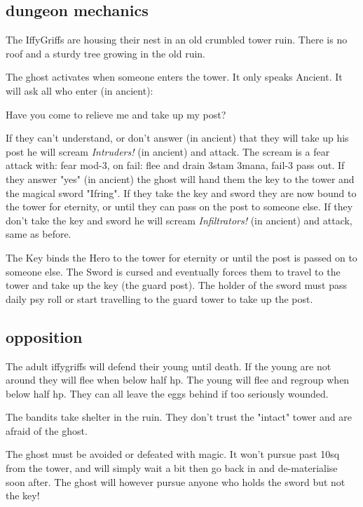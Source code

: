 \subsection*{dungeon mechanics}

The IffyGriffs are housing their nest in an old crumbled tower ruin. There is no roof and a sturdy tree growing in the old ruin.

The ghost activates when someone enters the tower. It only speaks Ancient. It will ask all who enter (in ancient):
\begin{readoutloud}
 Have you come to relieve me and take up my post?
\end{readoutloud}
If they can't understand, or don't answer (in ancient) that they will take up his post he will scream \emph{Intruders!} (in ancient) and attack. The scream is a fear attack with: fear mod-3, on fail: flee and drain 3stam 3mana, fail-3 pass out.
If they answer "yes" (in ancient) the ghost will hand them the key to the tower and the magical sword "Ifring". If they take the key and sword they are now bound to the tower for eternity, or until they can pass on the post to someone else. If they don't take the key and sword he will scream \emph{Infiltrators!} (in ancient) and attack, same as before.

The Key binds the Hero to the tower for eternity or until the post is passed on to someone else. The Sword is cursed and eventually forces them to travel to the tower and take up the key (the guard post). The holder of the sword must pass daily psy roll or start travelling to the guard tower to take up the post.


\subsection*{opposition}

The adult iffygriffs will defend their young until death. If the young are not around they will flee when below half hp. The young will flee and regroup when below half hp. They can all leave the eggs behind if too seriously wounded.

The bandits take shelter in the ruin. They don't trust the "intact" tower and are afraid of the ghost.

The ghost must be avoided or defeated with magic. It won't pursue past 10sq from the tower, and will simply wait a bit then go back in and de-materialise soon after. The ghost will however pursue anyone who holds the sword but not the key!


